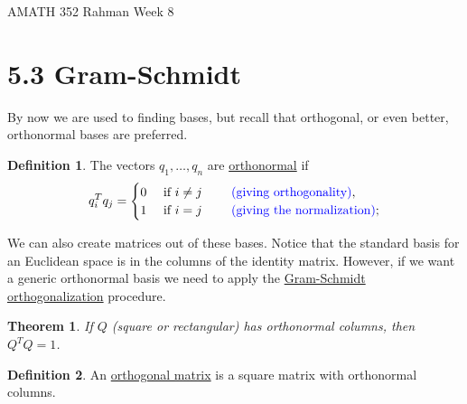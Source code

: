 \documentclass[reqno]{amsart}
\newtheorem{thm}{Theorem}
\theoremstyle{definition}
\newtheorem{definition}{Definition}
\begin{document}
\begin{flushleft}
{\sc \Large AMATH 352 Rahman} \hfill Week 8
\bigskip
\end{flushleft}

\newcommand{\R}{\mathbb{R}}
\newcommand{\N}{\mathbb{N}}
\newcommand{\Z}{\mathbb{Z}}
\newcommand{\Q}{\mathbb{Q}}
\renewcommand{\CancelColor}{\color{red}}
\newcommand{\?}{\stackrel{?}{=}}
\renewcommand{\varphi}{\phi}
\newcommand{\card}{\text{Card}}
\newcommand{\bigzero}{\text{\Huge 0}}
\newcommand{\curvearrowdown}{{\color{red}\rotatebox{90}{$\curvearrowleft$}}}
\newcommand{\curvearrowup}{{\color{red}\rotatebox{90}{$\curvearrowright$}}}

\newcommand*\circled[1]{\color{red}\tikz[baseline=(char.base)]{
            \node[shape=circle,draw,inner sep=2pt] (char) {#1};}}



\section*{5.3 Gram-Schmidt}

By now we are used to finding bases, but recall that orthogonal, or even better, orthonormal bases are preferred.

\begin{definition}
The vectors $q_1,\ldots,q_n$ are \underline{orthonormal} if
%
\begin{equation}
q_i^Tq_j = \begin{cases}
0 & \text{  if $i \neq j$ \qquad {\color{blue}(giving orthogonality)}},\\
1 & \text{  if $i = j$ \qquad {\color{blue}(giving the normalization)}};
\end{cases}
\end{equation}
\end{definition}

We can also create matrices out of these bases.  Notice that the standard basis for an Euclidean space
is in the columns of the identity matrix.  However, if we want a generic orthonormal basis we need to
apply the \underline{Gram-Schmidt orthogonalization} procedure.

\begin{thm}
If $Q$ (square or rectangular) has orthonormal columns, then $Q^TQ = 1$.
\end{thm}

\begin{definition}
An \underline{orthogonal matrix} is a square matrix with orthonormal columns.
\end{definition}
\end{document}

